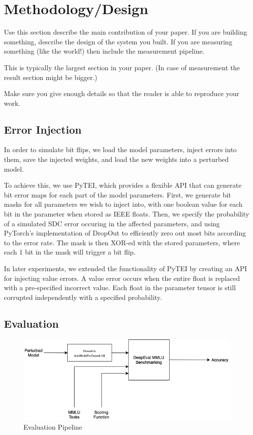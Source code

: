 \section{Methodology/Design}
\label{sec:methodology}

Use this section describe the main contribution of your paper. If you are
building something, describe the design of the system you built. If you are
measuring something (like the world!) then include the measurement pipeline.

This is typically the largest section in your paper. (In case of measurement the
result section might be bigger.)


Make sure you give enough details so that the reader is able to reproduce your
work.

\subsection{Error Injection}
In order to simulate bit flips, we load the model parameters, inject errors into them, save the injected weights,
and load the new weights into a perturbed model. 

To achieve this, we use PyTEI, which provides a flexible API that can generate bit error maps for each part of the model parameters. 
First, we generate bit masks for all parameters we wish to inject into, with one boolean value for each bit in the parameter when stored as IEEE floats.
Then, we specify the probability of a simulated SDC error occuring in the affected parameters, and using PyTorch's implementation of DropOut to efficiently
zero out most bits according to the error rate. The mask is then XOR-ed with the stored parameters, where each 1 bit in the mask will trigger a bit flip.

In later experiments, we extended the functionality of PyTEI by creating an API for injecting value errors. A value error occurs when the entire float is replaced with a pre-specified incorrect value. 
Each float in the parameter tensor is still corrupted independently with a specified probability. 

\subsection{Evaluation}
\begin{figure}
    \centering
    \includegraphics[width=1.0\linewidth]{Course Project Template/images/evaluation-pipeline.png}
    \caption{Evaluation Pipeline}
    \label{fig:eval-pipeline}
\end{figure}
